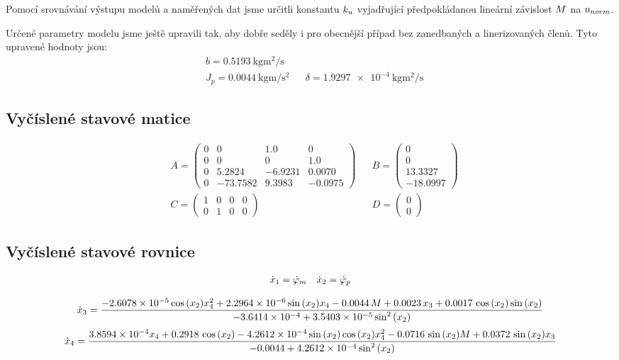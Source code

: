 \documentclass[11pt,a4paper]{article}
\begin{document}
 
Pomocí srovnávání výstupu modelů a naměřených dat jsme určitli konstantu $k_{u}$ vyjadřující předpokládanou lineární závislost $\M$ na $u_{norm}$.
 
Určené parametry modelu jsme ještě upravili tak, aby dobře seděly i pro obecnější případ bez zanedbaných a linerizovaných členů. Tyto upravené hodnoty jsou:
\begin{align*}
&b = \SI{0,5193}{\kilo \gram \meter \squared \per \second} \\
&J_p = \SI{0,0044}{\kilo \gram \metre \per \second \squared}	&&	\delta = \SI{1,9297e-4}{\kg \m \squared \per \second}
\end{align*}

\subsection{Vyčíslené stavové matice}
\begin{align*}
&A = 
\left(\begin{array}{cccc} 0 & 0 & 1.0 & 0\\
 0 & 0 & 0 & 1.0\\
 0 & 5.2824 & -6.9231 & 0.0070\\
 0 & -73.7582 & 9.3983 & -0.0975 \end{array}\right)
&&
B = 
\left(\begin{array}{c} 0\\ 0\\ 13.3327\\ -18.0997 \end{array}\right)\\
&C =
\left(\begin{array}{cccc} 1 & 0 & 0 & 0\\ 0 & 1 & 0 & 0 \end{array}\right)
&&D =
\left(\begin{array}{c} 0\\ 0 \end{array}\right)
\end{align*}
\subsection{Vyčíslené stavové rovnice}
\begin{align*}
& \xd{1} = \phid{m}    &&	\xd{2} = \phid{p} \\
\end{align*}
\begin{figure}[H]
\vspace*{-1.3 cm}
$$
\xd{3} =
\frac{
	\SI{-2.6078e-05}{} \coss{\x{2}} \x{4}^2 + \SI{2.2964e-06}{} \sinn{\x{2}} \x{4} - \SI{0.0044}{} \, \M + \SI{0.0023}{} \, \x{3} + \SI{0.0017}{} \, \coss{\x{2}} \sinn{\x{2}}
}{
 	\SI{-3.6414e-04}{} + \SI{3.5403e-05}{} \sinnN{\x{2}}
}
$$
$$
\xd{4} =
\frac{
	\SI{3.8594e-04}{} \x{4} + \SI{0.2918}{} \, \coss{\x{2}} - \SI{4.2612e-04}{} \sinn{\x{2}} \coss{\x{2}} \x{4}^2 - \SI{0.0716}{} \, \sinn{\x{2}} M + \SI{0.0372}{} \, \sinn{\x{2}} \x{3}
}{
	\SI{-0.0044}{} + \SI{4.2612e-04}{} \sinnN{\x{2}}
}
$$
\end{figure}
\end{document}
